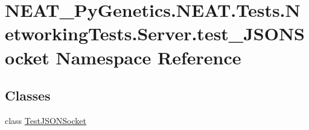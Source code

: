 \hypertarget{namespaceNEAT__PyGenetics_1_1NEAT_1_1Tests_1_1NetworkingTests_1_1Server_1_1test__JSONSocket}{}\section{N\+E\+A\+T\+\_\+\+Py\+Genetics.\+N\+E\+A\+T.\+Tests.\+Networking\+Tests.\+Server.\+test\+\_\+\+J\+S\+O\+N\+Socket Namespace Reference}
\label{namespaceNEAT__PyGenetics_1_1NEAT_1_1Tests_1_1NetworkingTests_1_1Server_1_1test__JSONSocket}
\subsection*{Classes}
\begin{DoxyCompactItemize}
\item 
class \hyperlink{classNEAT__PyGenetics_1_1NEAT_1_1Tests_1_1NetworkingTests_1_1Server_1_1test__JSONSocket_1_1TestJSONSocket}{Test\+J\+S\+O\+N\+Socket}
\end{DoxyCompactItemize}
